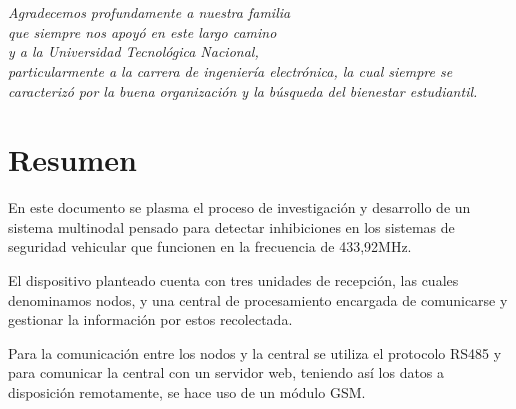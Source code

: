 \documentclass[12pt]{report}
\begin{document}

\chapter*{}
\begin{flushright}
\textit{Agradecemos profundamente a nuestra familia \\
que siempre nos apoyó en este largo camino \\
y a la Universidad Tecnológica Nacional, \\
particularmente a la carrera de ingeniería electrónica,
la cual siempre se caracterizó por la buena organización y la búsqueda del bienestar estudiantil.}
\end{flushright}

\chapter*{Resumen} %

En este documento se plasma el proceso de investigación y desarrollo de un sistema multinodal pensado para detectar 
inhibiciones en los sistemas de seguridad vehicular que funcionen en la frecuencia de 433,92MHz.\par
El dispositivo planteado cuenta con tres unidades de recepción, las cuales denominamos nodos, y una central de procesamiento
encargada de comunicarse y gestionar la información por estos recolectada. \par
Para la comunicación entre los nodos y la central se utiliza el protocolo RS485 
y para comunicar la central con un servidor web, teniendo así los datos a disposición remotamente, se hace uso de un módulo GSM.


\tableofcontents %

\cleardoublepage
\listoffigures %

\cleardoublepage

\end{document}
